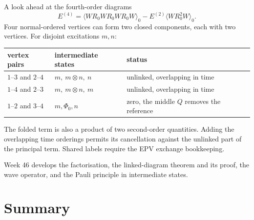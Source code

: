 \documentclass[aspectratio=169,10pt]{beamer}
\newcommand{\av}[1]{\langle #1\rangle_0}
\newcommand{\ph}{\Phi_0}
\begin{document}
\begin{frame}{A look ahead at the fourth-order diagrams}
\[
E^{(4)}=\av{WR_0WR_0WR_0W}-E^{(2)}\av{WR_0^2W}.
\]
Four normal-ordered vertices can form two closed components, each with two vertices. For disjoint excitations $m,n$:
\begin{center}
\begin{tabular}{lll}
\toprule
vertex pairs & intermediate states & status\\
\midrule
$1$--$3$ and $2$--$4$ & $m,\ m\otimes n,\ n$ & unlinked, overlapping in time\\
$1$--$4$ and $2$--$3$ & $m,\ m\otimes n,\ m$ & unlinked, overlapping in time\\
$1$--$2$ and $3$--$4$ & $m,\ph,n$ & zero, the middle $Q$ removes the reference\\
\bottomrule
\end{tabular}
\end{center}
The folded term is also a product of two second-order quantities. Adding the overlapping time orderings permits its cancellation against the unlinked part of the principal term. Shared labels require the EPV exchange bookkeeping.
\medskip

Week 46 develops the factorisation, the linked-diagram theorem and its proof, the wave operator, and the Pauli principle in intermediate states.
\end{frame}

\section{Summary}
\end{document}
